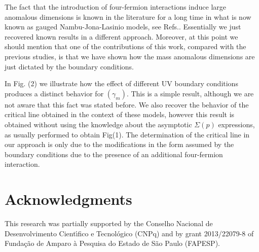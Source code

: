 \documentclass[preprint,amsmath,amssymb,superscriptaddress,showpacs,aps12pt]{revtex4}
\begin{document}
\par The fact that the introduction of four-fermion interactions induce large anomalous dimensions is known in the literature for a long time in what is now known as gauged Nambu-Jona-Lasinio  models, see  Refs.\cite{yama1, yama2, mira2, yama3, mira3, yama4}. Essentially we just recovered known results in a different approach. Moreover, at this point we should mention that one of the contributions of this work, compared with the previous  studies, is that  we have shown how the mass anomalous dimensions are just dictated by the boundary conditions. 

\par In Fig. (2) we illustrate how the effect of different UV boundary conditions produces a distinct behavior for $(\gamma_m)$. This  is a simple result, although we are not aware that this fact was stated before. We also recover the behavior of the critical line obtained in the context of these models, however this result is obtained without using the knowledge about the asymptotic $\Sigma(p)$ expressions,  as usually performed to obtain Fig(1). The determination of the critical line in our approach is only due to the modifications in the form assumed by the boundary conditions  due to the  presence of an additional four-fermion
interaction.





\section*{Acknowledgments}
This research was  partially supported by the Conselho Nacional de Desenvolvimento Cient\'{\i}fico e Tecnol\'ogico (CNPq) and by grant 
2013/22079-8 of Funda\c{c}\~{a}o de Amparo \`{a} Pesquisa do Estado de S\~ao Paulo (FAPESP). 





\end{document}
